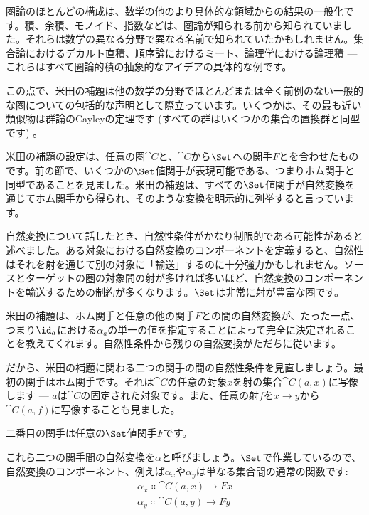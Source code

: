 
\lettrine[lhang=0.17]{圏}{論}のほとんどの構成は、数学の他のより具体的な領域からの結果の一般化です。積、余積、モノイド、指数などは、圏論が知られる前から知られていました。それらは数学の異なる分野で異なる名前で知られていたかもしれません。集合論におけるデカルト直積、順序論におけるミート、論理学における論理積 — これらはすべて圏論的積の抽象的なアイデアの具体的な例です。

この点で、米田の補題は他の数学の分野でほとんどまたは全く前例のない一般的な圏についての包括的な声明として際立っています。いくつかは、その最も近い類似物は群論のCayleyの定理です (すべての群はいくつかの集合の置換群と同型です) 。

米田の補題の設定は、任意の圏$\cat{C}$と、$\cat{C}$から$\Set$への関手$F$とを合わせたものです。前の節で、いくつかの$\Set$値関手が表現可能である、つまりホム関手と同型であることを見ました。米田の補題は、すべての$\Set$値関手が自然変換を通じてホム関手から得られ、そのような変換を明示的に列挙すると言っています。

自然変換について話したとき、自然性条件がかなり制限的である可能性があると述べました。ある対象における自然変換のコンポーネントを定義すると、自然性はそれを射を通じて別の対象に「輸送」するのに十分強力かもしれません。ソースとターゲットの圏の対象間の射が多ければ多いほど、自然変換のコンポーネントを輸送するための制約が多くなります。$\Set$は非常に射が豊富な圏です。

米田の補題は、ホム関手と任意の他の関手$F$との間の自然変換が、たった一点、つまり$\id_a$における$\alpha_a$の単一の値を指定することによって完全に決定されることを教えてくれます。自然性条件から残りの自然変換がただちに従います。

だから、米田の補題に関わる二つの関手の間の自然性条件を見直しましょう。最初の関手はホム関手です。それは$\cat{C}$の任意の対象$x$を射の集合$\cat{C}(a, x)$に写像します — $a$は$\cat{C}$の固定された対象です。また、任意の射$f$を$x \to y$から$\cat{C}(a, f)$に写像することも見ました。

二番目の関手は任意の$\Set$値関手$F$です。

これら二つの関手間の自然変換を$\alpha$と呼びましょう。$\Set$で作業しているので、自然変換のコンポーネント、例えば$\alpha_x$や$\alpha_y$は単なる集合間の通常の関数です: 
\begin{gather*}
  \alpha_x \Colon \cat{C}(a, x) \to F x \\
  \alpha_y \Colon \cat{C}(a, y) \to F y
\end{gather*}


